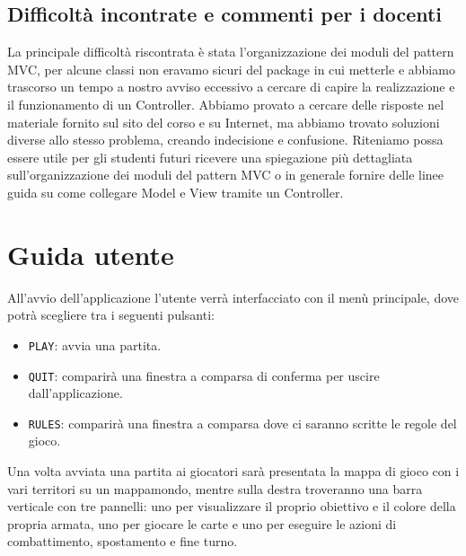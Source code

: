 \documentclass[a4paper,12pt]{report}
\begin{document}
\section{Difficolt\`a incontrate e commenti per i docenti}
%
La principale difficolt\`a riscontrata \`e stata l'organizzazione dei moduli del pattern MVC, per alcune classi non eravamo sicuri del package in cui metterle e abbiamo trascorso un tempo a nostro avviso eccessivo a cercare di capire la realizzazione e il funzionamento di un Controller. Abbiamo provato a cercare delle risposte nel materiale fornito sul sito del corso e su Internet, ma abbiamo trovato soluzioni diverse allo stesso problema, creando indecisione e confusione. Riteniamo possa essere utile per gli studenti futuri ricevere una spiegazione pi\`u dettagliata sull'organizzazione dei moduli del pattern MVC o in generale fornire delle linee guida su come collegare Model e View tramite un Controller.
%
\appendix
\chapter{Guida utente}
%
All'avvio dell'applicazione l'utente verr\`a interfacciato con il men\`u principale, dove potr\`a scegliere tra i seguenti pulsanti:
%
\begin{itemize}
    \item{\texttt{PLAY}:} avvia una partita.
    \item{\texttt{QUIT}:} comparir\`a una finestra a comparsa di conferma per uscire dall'applicazione.
    \item {\texttt{RULES}:} comparir\`a una finestra a comparsa dove ci saranno scritte le regole del gioco.
\end{itemize}
%
Una volta avviata una partita ai giocatori sar\`a presentata la mappa di gioco con i vari territori su un mappamondo, mentre sulla destra troveranno una barra verticale con tre pannelli: uno per visualizzare il proprio obiettivo e il colore della propria armata, uno per giocare le carte e uno per eseguire le azioni di combattimento, spostamento e fine turno.
%
\end{document}
